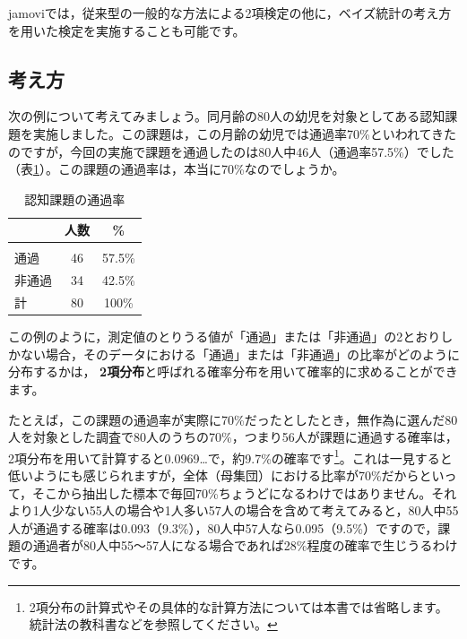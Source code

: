 \documentclass[
  12pt,
  a5jpaper,
  lualatex, ja=standard]{bxjsbook}
\renewcommand{\emph}[1]{\textbf{\color{emph} #1}}
\begin{document}
jamoviでは，従来型の一般的な方法による2項検定の他に，ベイズ統計の考え方を用いた検定を実施することも可能です。

\hypertarget{sub:frequencies-binomial-basics}{%
\subsection{考え方}\label{sub:frequencies-binomial-basics}}

次の例について考えてみましょう。同月齢の80人の幼児を対象としてある認知課題を実施しました。この課題は，この月齢の幼児では通過率70\%といわれてきたのですが，今回の実施で課題を通過したのは80人中46人（通過率57.5\%）でした（表\ref{tab:frequencies-table-pf}）。この課題の通過率は，本当に70\%なのでしょうか。

\begin{table}[H]

\caption{\label{tab:frequencies-table-pf}認知課題の通過率}
\centering
\begin{tabular}[t]{lcc}
\toprule
  & 人数 & \%\\
\midrule
\addlinespace[0.3em]
\multicolumn{3}{l}{\textbf{結果}}\\
\hspace{1em}通過 & 46 & 57.5\%\\
\hspace{1em}非通過 & 34 & 42.5\%\\
計 & 80 & 100\%\\
\bottomrule
\end{tabular}
\end{table}

この例のように，測定値のとりうる値が「通過」または「非通過」の2とおりしかない場合，そのデータにおける「通過」または「非通過」の比率がどのように分布するかは，\emph{2項分布}と呼ばれる確率分布を用いて確率的に求めることができます。

たとえば，この課題の通過率が実際に70\%だったとしたとき，無作為に選んだ80人を対象とした調査で80人のうちの70\%，つまり56人が課題に通過する確率は，2項分布を用いて計算すると0.0969\ldots で，約9.7\%の確率です\footnote{2項分布の計算式やその具体的な計算方法については本書では省略します。統計法の教科書などを参照してください。}。これは一見すると低いようにも感じられますが，全体（母集団）における比率が70\%だからといって，そこから抽出した標本で毎回70\%ちょうどになるわけではありません。それより1人少ない55人の場合や1人多い57人の場合を含めて考えてみると，80人中55人が通過する確率は0.093（9.3\%），80人中57人なら0.095（9.5\%）ですので，課題の通過者が80人中55〜57人になる場合であれば28\%程度の確率で生じうるわけです。
\end{document}
